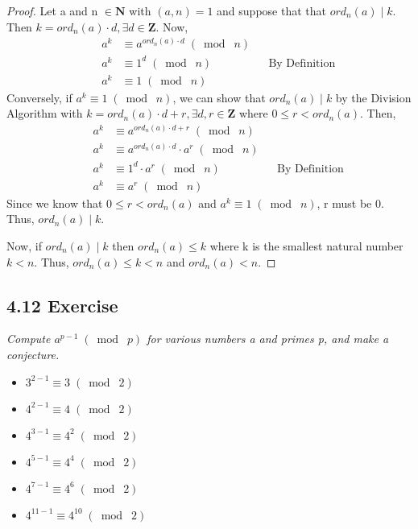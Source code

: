 \documentclass{article}
\begin{document}
\begin{proof}
Let a and n $\in \mathbf{N}$ with $(a, n) = 1$ and suppose that that $ord_n(a) \mid k$. Then $k = ord_n(a) \cdot d, \exists d \in \mathbf{Z}$. Now,
\begin{align*}
    && a^k &\equiv a^{ord_n(a) \cdot d} \;(\bmod\; n)&&\\
    && a^k &\equiv 1^d \;(\bmod\; n)&& \text{By Definition}\\
    && a^k &\equiv 1 \;(\bmod\; n)&&
\end{align*}
Conversely, if $a^k \equiv 1 \;(\bmod\; n)$, we can show that $ord_n(a) \mid k$ by the Division Algorithm with $k = ord_n(a) \cdot d + r, \exists d, r \in \mathbf{Z}$ where $0 \leq r < ord_n(a)$. Then, 
\begin{align*}
    && a^k &\equiv a^{ord_n(a) \cdot d + r} \;(\bmod\; n)&&\\
    && a^k &\equiv a^{ord_n(a) \cdot d} \cdot a^r \;(\bmod\; n)&&\\
    && a^k &\equiv 1^d \cdot a^r \;(\bmod\; n)&& \text{By Definition}\\
    && a^k &\equiv a^r \;(\bmod\; n)&&
\end{align*}
Since we know that $0 \leq r < ord_n(a)$ and $a^k \equiv 1 \;(\bmod\; n)$, r must be 0. Thus, $ord_n(a) \mid k$.

Now, if $ord_n(a) \mid k$ then $ord_n(a) \leq k$ where k is the smallest natural number $k < n$. Thus, $ord_n(a) \leq k < n$ and $ord_n(a) < n$.
\end{proof}

\subsection*{4.12 Exercise} 
\quad \textit{Compute $a^{p-1} \;(\bmod\; p)$ for various numbers a and primes p, and make a conjecture.}

\begin{itemize}
    \item $3^{2-1} \equiv 3 \;(\bmod\; 2)$
    \item $4^{2-1} \equiv 4 \;(\bmod\; 2)$
    \item $4^{3-1} \equiv 4^2 \;(\bmod\; 2)$
    \item $4^{5-1} \equiv 4^4 \;(\bmod\; 2)$
    \item $4^{7-1} \equiv 4^6 \;(\bmod\; 2)$
    \item $4^{11-1} \equiv 4^{10} \;(\bmod\; 2)$
\end{itemize}
\end{document}

